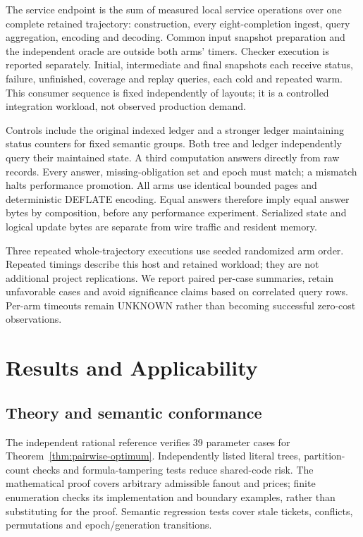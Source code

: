 \documentclass[preprint,12pt]{elsarticle}
\theoremstyle{definition}\newtheorem{definition}[theorem]{Definition}
\begin{document}
The service endpoint is the sum of measured local service operations over
one complete retained trajectory: construction, every eight-completion
ingest, query aggregation, encoding and decoding. Common input snapshot
preparation and the independent oracle are outside both arms' timers.
Checker execution is reported separately. Initial, intermediate and final
snapshots each receive status, failure, unfinished, coverage and replay
queries, each cold and repeated warm. This consumer sequence is fixed
independently of layouts; it is a controlled integration workload, not
observed production demand.

Controls include the original indexed ledger and a stronger ledger maintaining
status counters for fixed semantic groups. Both tree and ledger independently
query their maintained state. A third computation answers directly from raw
records. Every answer, missing-obligation set and epoch must match;
a mismatch halts performance promotion. All arms use identical bounded
pages and deterministic DEFLATE encoding. Equal answers therefore imply
equal answer bytes by composition, before any performance experiment.
Serialized state and logical update bytes are separate from wire traffic
and resident memory.

Three repeated whole-trajectory executions use seeded randomized arm order.
Repeated timings describe this host and retained workload; they are not
additional project replications. We report paired per-case summaries,
retain unfavorable cases and avoid significance claims based on correlated
query rows. Per-arm timeouts remain $\mathrm{UNKNOWN}$ rather than becoming
successful zero-cost observations.



\section{Results and Applicability}\label{sec:jresults}
\subsection{Theory and semantic conformance}
The independent rational reference verifies 39 parameter cases for
Theorem~\ref{thm:pairwise-optimum}. Independently listed literal trees,
partition-count checks and formula-tampering tests reduce shared-code risk.
The mathematical proof covers arbitrary admissible fanout and prices;
finite enumeration checks its implementation and boundary examples, rather
than substituting for the proof. Semantic regression tests cover stale
tickets, conflicts, permutations and epoch/generation transitions.
\end{document}
